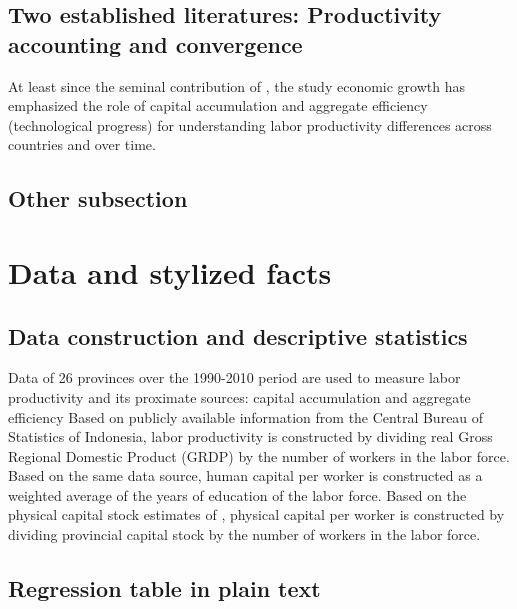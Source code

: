\documentclass[11pt,a4paper,]{article}
\begin{document}
\hypertarget{two-established-literatures-productivity-accounting-and-convergence}{%
\subsection{Two established literatures: Productivity accounting and convergence}\label{two-established-literatures-productivity-accounting-and-convergence}}

At least since the seminal contribution of \textcite{solow1956contribution}, the study economic growth has emphasized the role of capital accumulation and aggregate efficiency (technological progress) for understanding labor productivity differences across countries and over time.

\hypertarget{other-subsection}{%
\subsection{Other subsection}\label{other-subsection}}

\hypertarget{data-and-stylized-facts}{%
\section{Data and stylized facts}\label{data-and-stylized-facts}}

\hypertarget{data-construction-and-descriptive-statistics}{%
\subsection{Data construction and descriptive statistics}\label{data-construction-and-descriptive-statistics}}

Data of 26 provinces over the 1990-2010 period are used to measure labor productivity and its proximate sources: capital accumulation and aggregate efficiency
Based on publicly available information from the Central Bureau of Statistics of Indonesia, labor productivity is constructed by dividing real Gross Regional Domestic Product (GRDP) by the number of workers in the labor force.
Based on the same data source, human capital per worker is constructed as a weighted average of the years of education of the labor force.
Based on the physical capital stock estimates of \textcite{kataoka2013capital}, physical capital per worker is constructed by dividing provincial capital stock by the number of workers in the labor force.

\hypertarget{regression-table-in-plain-text}{%
\subsection{Regression table in plain text}\label{regression-table-in-plain-text}}
\end{document}
